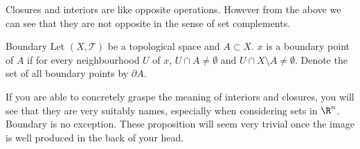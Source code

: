 Closures and interiors are like opposite operations. However from the above we can see that they are not opposite in the sense of set complements. 

\begin{defn}{Boundary}{} Let $(X,\mathcal{T})$ be a topological space and $A\subset X$. $x$ is a boundary point of $A$ if for every neighbourhood $U$ of $x$, $U\cap A\neq\emptyset$ and $U\cap X\setminus A\neq\emptyset$. Denote the set of all boundary points by $\partial A$. 
\end{defn}

If you are able to concretely graspe the meaning of interiors and closures, you will see that they are very suitably names, especially when considering sets in $\R^n$. Boundary is no exception. These proposition will seem very trivial once the image is well produced in the back of your head. 

